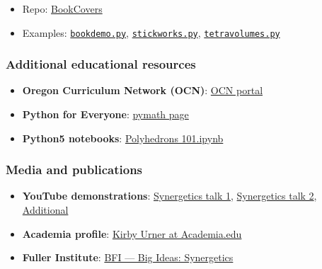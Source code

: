 \documentclass[
]{article}
\providecommand{\tightlist}{%
  \setlength{\itemsep}{0pt}\setlength{\parskip}{0pt}}
\begin{document}
\begin{itemize}
  \begin{itemize}
  \tightlist
  \item
    Repo: \href{https://github.com/4dsolutions/BookCovers}{BookCovers}
  \item
    Examples:
    \href{https://github.com/4dsolutions/BookCovers/blob/master/bookdemo.py}{\texttt{bookdemo.py}},
    \href{https://github.com/4dsolutions/BookCovers/blob/master/stickworks.py}{\texttt{stickworks.py}},
    \href{https://github.com/4dsolutions/BookCovers/blob/master/tetravolumes.py}{\texttt{tetravolumes.py}}
  \end{itemize}
\end{itemize}

\hypertarget{additional-educational-resources}{%
\subsubsection{Additional educational
resources}\label{additional-educational-resources}}

\begin{itemize}
\tightlist
\item
  \textbf{Oregon Curriculum Network (OCN)}:
  \href{http://www.4dsolutions.net/ocn/}{OCN portal}
\item
  \textbf{Python for Everyone}:
  \href{http://www.4dsolutions.net/ocn/pymath.html}{pymath page}
\item
  \textbf{Python5 notebooks}:
  \href{https://raw.githubusercontent.com/4dsolutions/Python5/master/Polyhedrons\%20101.ipynb}{Polyhedrons
  101.ipynb}
\end{itemize}

\hypertarget{media-and-publications}{%
\subsubsection{Media and publications}\label{media-and-publications}}

\begin{itemize}
\tightlist
\item
  \textbf{YouTube demonstrations}:
  \href{https://www.youtube.com/watch?v=g14mu4uWD4E}{Synergetics talk
  1}, \href{https://www.youtube.com/watch?v=i9oij02oje0}{Synergetics
  talk 2},
  \href{https://www.youtube.com/watch?v=D0M1h_gjA_w}{Additional}
\item
  \textbf{Academia profile}:
  \href{https://princeton.academia.edu/kirbyurner}{Kirby Urner at
  Academia.edu}
\item
  \textbf{Fuller Institute}:
  \href{https://www.bfi.org/about-fuller/big-ideas/synergetics/}{BFI ---
  Big Ideas: Synergetics}
\end{itemize}
\end{document}
